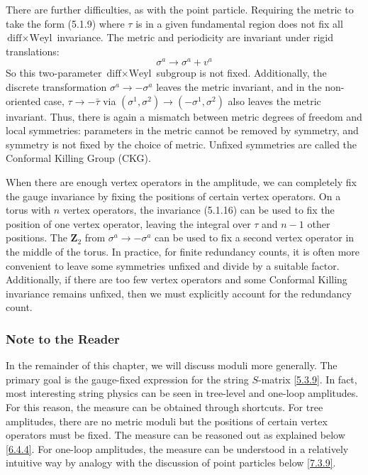 There are further difficulties, as with the point particle. Requiring the metric to take the form (5.1.9) where $\tau$ is in a given fundamental region does not fix all $\text{diff} \times \text{Weyl}$ invariance. The metric and periodicity are invariant under rigid translations:
\begin{equation}
	\sigma^{a} \rightarrow \sigma^{a}+v^{a}
\end{equation}
So this two-parameter $\text{diff} \times \text{Weyl}$ subgroup is not fixed. Additionally, the discrete transformation $\sigma^{a} \rightarrow-\sigma^{a}$ leaves the metric invariant, and in the non-oriented case, $\tau \rightarrow-\bar{\tau}$ via $\left(\sigma^{1}, \sigma^{2}\right) \rightarrow\left(-\sigma^{1}, \sigma^{2}\right)$ also leaves the metric invariant. Thus, there is again a mismatch between metric degrees of freedom and local symmetries: parameters in the metric cannot be removed by symmetry, and symmetry is not fixed by the choice of metric. Unfixed symmetries are called the Conformal Killing Group (CKG).

When there are enough vertex operators in the amplitude, we can completely fix the gauge invariance by fixing the positions of certain vertex operators. On a torus with $n$ vertex operators, the invariance (5.1.16) can be used to fix the position of one vertex operator, leaving the integral over $\tau$ and $n-1$ other positions. The $\mathbf{Z}_{2}$ from $\sigma^{a} \rightarrow-\sigma^{a}$ can be used to fix a second vertex operator in the middle of the torus. In practice, for finite redundancy counts, it is often more convenient to leave some symmetries unfixed and divide by a suitable factor. Additionally, if there are too few vertex operators and some Conformal Killing invariance remains unfixed, then we must explicitly account for the redundancy count.

\subsubsection*{\Large Note to the Reader}
In the remainder of this chapter, we will discuss moduli more generally. The primary goal is the gauge-fixed expression for the string $S$-matrix \eqref{5.3.9}. In fact, most interesting string physics can be seen in tree-level and one-loop amplitudes. For this reason, the measure can be obtained through shortcuts. For tree amplitudes, there are no metric moduli but the positions of certain vertex operators must be fixed. The measure can be reasoned out as explained below \eqref{6.4.4}. For one-loop amplitudes, the measure can be understood in a relatively intuitive way by analogy with the discussion of point particles below \eqref{7.3.9}.

